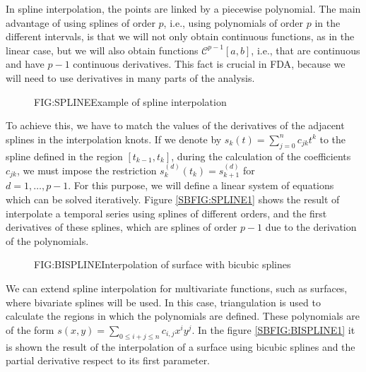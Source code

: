 
In spline interpolation\cite{Boor1981}, the points are linked by a piecewise
polynomial.
The main advantage of using splines of order $p$, i.e., using polynomials of
order $p$ in the different intervals, is that we will not only obtain continuous
functions, as in the linear case, but we will also obtain functions
$\mathcal{C}^{p-1}[a,b]$, i.e., that are continuous and have $p-1$ continuous
derivatives. This fact is crucial in \acs{FDA}, because we will need
to use derivatives in many parts of the analysis.

\begin{figure}[Example of spline interpolation]{FIG:SPLINE}{Example of spline interpolation}
	 \quad
\end{figure}

To achieve this, we have to match the values of the derivatives of the
adjacent splines in the interpolation knots. If we denote by
$s_k(t)=\sum_{j=0}^n c_{jk} t^k$ to the spline defined in the region
$[t_{k-1}, t_{k}]$, during the calculation of the coefficients $c_{jk}$, we must
impose the restriction $s_{k}^{(d)}(t_k) = s_{k+1}^{(d)}$ for \\ $d=1, \dots, p-1$.
For this purpose, we will define a linear system of equations which can be
solved iteratively. Figure \ref{SBFIG:SPLINE1} shows the result of interpolate a
temporal series using splines of different orders, and the first derivatives of
these splines, which are splines of order $p-1$ due to the derivation of the
polynomials.

\begin{figure}[Interpolation of surface]{FIG:BISPLINE}{Interpolation of surface with bicubic splines}
	 \quad
\end{figure}

We can extend spline interpolation for multivariate functions, such as surfaces,
where bivariate splines will be used. In this case, triangulation is used
to calculate the regions in which the polynomials are defined. These polynomials
are of the form $s(x, y) = \sum_{0 \le i + j \le n} c_{i,j}x^i y^j$.
In the figure \ref{SBFIG:BISPLINE1} it is shown the result of the
interpolation of a surface using bicubic splines and the partial derivative
respect to its first parameter.
